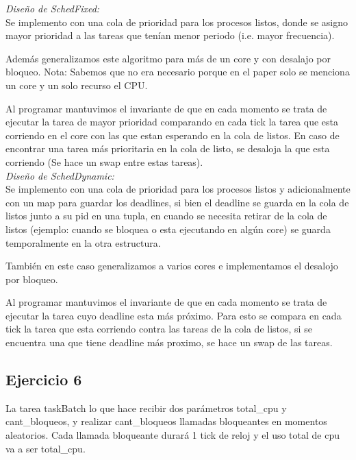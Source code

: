 \noindent
\emph{Diseño de SchedFixed:} \\

Se implemento con una cola de prioridad para los procesos listos, donde se asigno mayor prioridad a las tareas que tenían menor periodo (i.e. mayor frecuencia). 

Además generalizamos este algoritmo para más de un core y con desalajo por bloqueo.
Nota: Sabemos que no era necesario porque en el paper solo se menciona un core y un solo recurso el CPU.

Al programar mantuvimos el invariante de que en cada momento se trata de ejecutar la tarea de mayor prioridad comparando en cada tick la tarea que esta corriendo en el core con las que estan esperando en la cola de listos. En caso de encontrar una tarea más prioritaria en la cola de listo, se desaloja la que esta corriendo (Se hace un swap entre estas tareas).\\


\noindent
\emph{Diseño de SchedDynamic:} \\

Se implemento con una cola de prioridad para los procesos listos y adicionalmente con un map para guardar los deadlines, si bien el deadline se guarda en la cola de listos junto a su pid en una tupla, en cuando se necesita retirar de la cola de listos (ejemplo: cuando se bloquea o esta ejecutando en algún core) se guarda temporalmente en la otra estructura.

También en este caso generalizamos a varios cores e implementamos el desalojo por bloqueo.

Al programar mantuvimos el invariante de que en cada momento se trata de ejecutar la tarea cuyo deadline esta más próximo. Para esto se compara en cada tick la tarea que esta corriendo contra las tareas de la cola de listos, si se encuentra una que tiene deadline más proximo, se hace un swap de las tareas.\\


\subsection{Ejercicio 6}

La tarea taskBatch lo que hace recibir dos parámetros total\_cpu y cant\_bloqueos, y realizar
cant\_bloqueos llamadas bloqueantes en momentos aleatorios. Cada llamada bloqueante durará 1
tick de reloj y el uso total de cpu va a ser total\_cpu. \\

